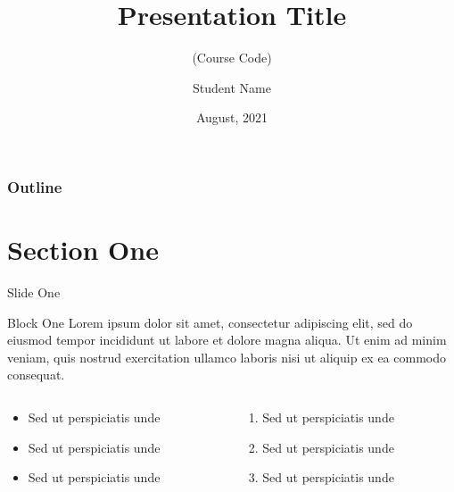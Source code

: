 \documentclass[aspectratio=169]{beamer}  %
\title[Course Name (Course Code)]{Presentation Title}
\subtitle{(Course Code)}
\author{Student Name}
\institute[Exam Roll]{
    Exam Roll\\ 
    Reg. No\\ \medskip
    Department Name \\ 
    University Name \\ \medskip
    Email: \textit{me@domain.edu} 
}
\date{August, 2021}
\begin{document}
{
\begin{frame}
\titlepage
\end{frame}
\begin{frame}[noframenumbering]
\frametitle{Outline} 
\tableofcontents %
\end{frame}
}


\section{Section One} 
\begin{frame}{Slide One}
\begin{block}{Block One}
Lorem ipsum dolor sit amet, consectetur adipiscing elit, sed do eiusmod tempor incididunt ut labore et dolore magna aliqua. Ut enim ad minim veniam, quis nostrud exercitation ullamco laboris nisi ut aliquip ex ea commodo consequat. 
\end{block}
    \begin{columns} %
        \begin{column}{0.5\textwidth} 
                    \begin{itemize}
                        \justifying 
                        \item Sed ut perspiciatis unde
                        \item Sed ut perspiciatis unde
                        \item Sed ut perspiciatis unde
                    \end{itemize}
        \end{column}
        \begin{column}{0.5\textwidth}  
                \begin{enumerate}
                    \justifying 
                    \item Sed ut perspiciatis unde
                    \item Sed ut perspiciatis unde
                    \item Sed ut perspiciatis unde
                \end{enumerate}
        \end{column}
    \end{columns}
\end{frame}
\end{document}

